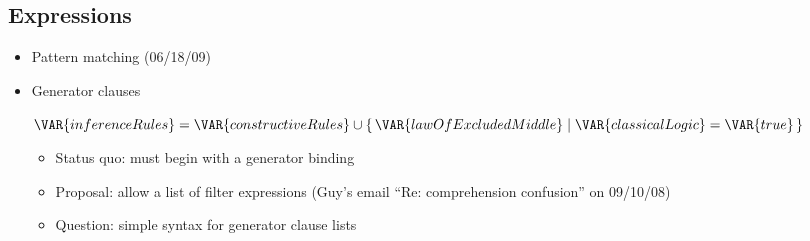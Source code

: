 \subsection{Expressions}
\begin{itemize}
\item Pattern matching (06/18/09)

\item Generator clauses
\begin{Fortress}
\(\VAR{inferenceRules} = \VAR{constructiveRules} \cup \{\,\VAR{lawOfExcludedMiddle} \mid \VAR{classicalLogic} = \VAR{true}\,\}\)
\end{Fortress}
\begin{itemize}
\item Status quo: must begin with a generator binding
\item Proposal: allow a list of filter expressions (Guy's email ``Re: comprehension confusion'' on 09/10/08)
\item Question: simple syntax for generator clause lists
\end{itemize}


\end{itemize}

